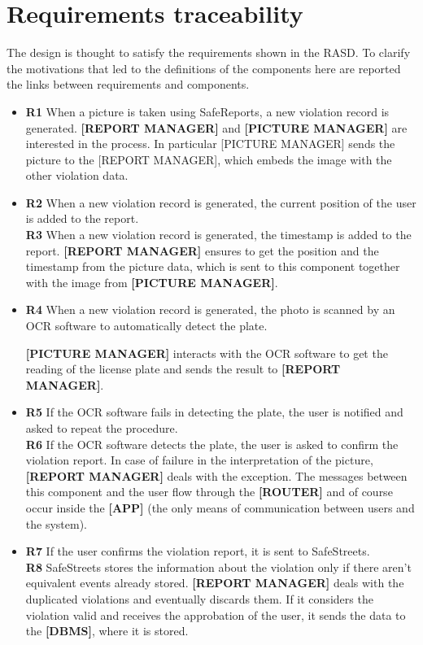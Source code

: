 \documentclass[a4paper]{article}
\begin{document}
\newpage
\section{Requirements traceability}
The design is thought to satisfy the requirements shown in the RASD. To clarify the motivations that led to the definitions of the components here are reported the links between requirements and components.

\begin{itemize}
\item
  \textbf{R1} When a picture is taken using SafeReports, a new violation
  record is generated.
    \subitem 
    \textbf{[REPORT MANAGER]} and \textbf{[PICTURE MANAGER]} are interested in the process. In particular [PICTURE MANAGER] sends the picture to the [REPORT MANAGER], which embeds the image with the other violation data.
  	
\item
  \textbf{R2} When a new violation record is generated, the current
  position of the user is added to the report.\\
  \textbf{R3} When a new violation record is generated, the timestamp is
  added to the report.
  \subitem
    \textbf{[REPORT MANAGER]} ensures to get the position and the timestamp from the picture data, which is sent to this component together with the image from \textbf{[PICTURE MANAGER]}.
  
\item
  \textbf{R4} When a new violation record is generated, the photo is
  scanned by an OCR software to automatically detect the plate.
    
   \subitem
      \textbf{[PICTURE MANAGER]} interacts with the OCR software to get the reading of the license plate and sends the result to \textbf{[REPORT MANAGER]}.
  
\item
  \textbf{R5} If the OCR software fails in detecting the plate, the user
  is notified and asked to repeat the procedure.\\
  \textbf{R6} If the OCR software detects the plate, the user is asked
  to confirm the violation report.
  \subitem
    In case of failure in the interpretation of the picture, \textbf{[REPORT MANAGER]} deals with the exception. The messages between this component and the user flow through the \textbf{[ROUTER]} and of course occur inside the \textbf{[APP]} (the only means of communication between users and the system).
  
\item
  \textbf{R7} If the user confirms the violation report, it is sent to
  SafeStreets.\\
  \textbf{R8} SafeStreets stores the information about the violation
  only if there aren't equivalent events already stored.
   \subitem
   \textbf{[REPORT MANAGER]} deals with the duplicated violations and eventually discards them. If it considers the violation valid and receives the approbation of the user, it sends the data to the \textbf{[DBMS]}, where it is stored.
  
\end{itemize}
\end{document}
